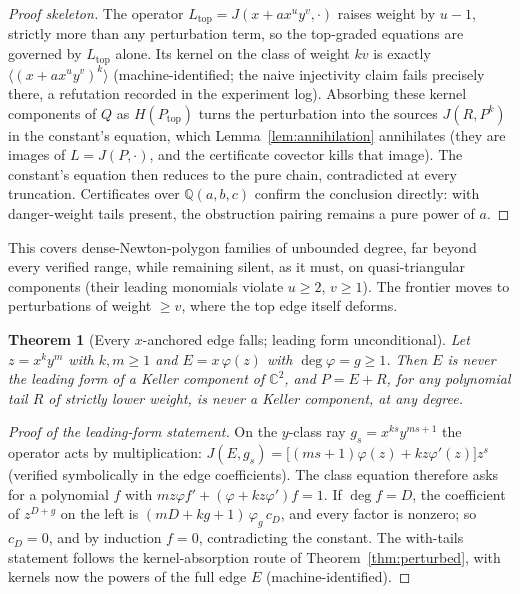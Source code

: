 \documentclass[11pt]{article}
\newtheorem{theorem}{Theorem}[section]
\theoremstyle{definition}
\theoremstyle{remark}
\newcommand{\C}{\mathbb{C}}
\begin{document}
\begin{proof}[Proof skeleton]
The operator $L_{\mathrm{top}} = J(x + a x^u y^v, \cdot)$ raises weight by $u - 1$, strictly
more than any perturbation term, so the top-graded equations are governed by
$L_{\mathrm{top}}$ alone. Its kernel on the class of weight $kv$ is exactly
$\langle (x + a x^u y^v)^k \rangle$ (machine-identified; the naive injectivity claim fails
precisely there, a refutation recorded in the experiment log). Absorbing these kernel
components of $Q$ as $H(P_{\mathrm{top}})$ turns the perturbation into the sources
$J(R, P^k)$ in the constant's equation, which Lemma~\ref{lem:annihilation} annihilates
(they are images of $L = J(P, \cdot)$, and the certificate covector kills that image). The
constant's equation then reduces to the pure chain, contradicted at every truncation. Certificates over $\mathbb{Q}(a, b, c)$ confirm the
conclusion directly: with danger-weight tails present, the obstruction pairing remains a
pure power of $a$.
\end{proof}

This covers dense-Newton-polygon families of unbounded degree, far beyond every verified
range, while remaining silent, as it must, on quasi-triangular components (their leading
monomials violate $u \ge 2$, $v \ge 1$). The frontier moves to perturbations of weight
$\ge v$, where the top edge itself deforms.

\begin{theorem}[Every $x$-anchored edge falls; leading form unconditional]\label{thm:fulledge}
Let $z = x^k y^m$ with $k, m \ge 1$ and $E = x\,\varphi(z)$ with $\deg \varphi = g \ge 1$.
Then $E$ is never the leading form of a Keller component of $\C^2$, and $P = E + R$, for any
polynomial tail $R$ of strictly lower weight, is never a Keller component, at any degree.
\end{theorem}

\begin{proof}[Proof of the leading-form statement]
On the $y$-class ray $g_s = x^{ks} y^{ms+1}$ the operator acts by multiplication:
$J(E, g_s) = \bigl[(ms+1)\varphi(z) + k z \varphi'(z)\bigr] z^s$ (verified symbolically in
the edge coefficients). The class equation therefore asks for a polynomial $f$ with
$m z \varphi f' + (\varphi + k z \varphi') f = 1$. If $\deg f = D$, the coefficient of
$z^{D+g}$ on the left is $(mD + kg + 1)\,\varphi_g\,c_D$, and every factor is nonzero; so
$c_D = 0$, and by induction $f = 0$, contradicting the constant. The with-tails statement
follows the kernel-absorption route of Theorem~\ref{thm:perturbed}, with kernels now the
powers of the full edge $E$ (machine-identified).
\end{proof}
\end{document}

